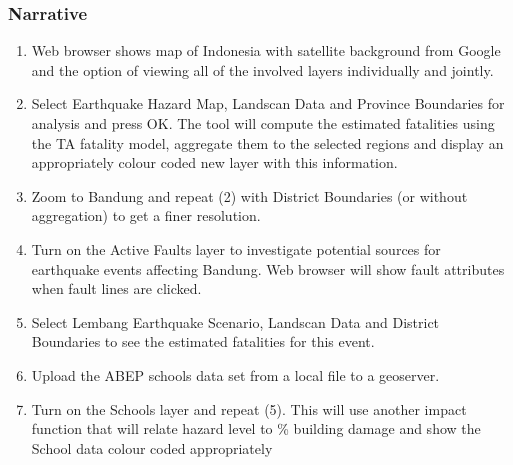 \documentclass[a4paper]{article}
\begin{document}
\subsubsection*{Narrative}

\begin{enumerate} 
  \item Web browser shows map of Indonesia with satellite background from Google and the option of viewing all of the involved layers individually and jointly.
  \item Select Earthquake Hazard Map, Landscan Data and Province Boundaries for analysis and press OK. The tool will compute the estimated fatalities using the TA fatality model, aggregate them to the selected regions and display an appropriately colour coded new layer with this information.
  \item Zoom to Bandung and repeat (2) with District Boundaries (or without aggregation) to get a finer resolution.
  \item Turn on the Active Faults layer to investigate potential sources for earthquake events affecting Bandung. Web browser will show fault attributes when fault lines are clicked.
  \item Select Lembang Earthquake Scenario, Landscan Data and District Boundaries to see the estimated fatalities for this event.
  \item Upload the ABEP schools data set from a local file to a geoserver.
  \item Turn on the Schools layer and repeat (5). This will use another impact function that will relate hazard level to \% building damage and show the School data colour coded appropriately
\end{enumerate} 
\end{document}
